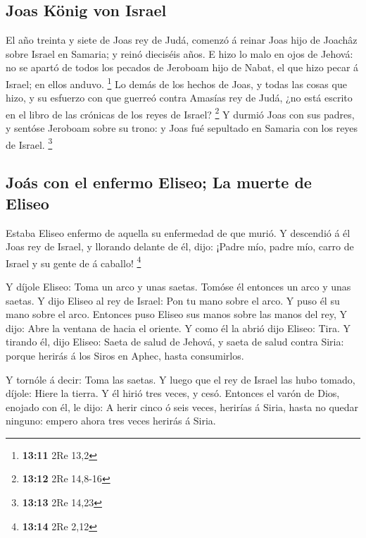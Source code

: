 \hypertarget{joas-kuxf6nig-von-israel}{%
\subsection{Joas König von Israel}\label{joas-kuxf6nig-von-israel}}

 El año treinta y siete de Joas rey de Judá, comenzó á
reinar Joas hijo de Joachâz sobre Israel en Samaria; y reinó dieciséis
años.  E hizo lo malo en ojos de Jehová: no se apartó de
todos los pecados de Jeroboam hijo de Nabat, el que hizo pecar á Israel;
en ellos anduvo. \footnote{\textbf{13:11} 2Re 13,2}  Lo
demás de los hechos de Joas, y todas las cosas que hizo, y su esfuerzo
con que guerreó contra Amasías rey de Judá, ¿no está escrito en el libro
de las crónicas de los reyes de Israel? \footnote{\textbf{13:12} 2Re
  14,8-16}  Y durmió Joas con sus padres, y sentóse
Jeroboam sobre su trono: y Joas fué sepultado en Samaria con los reyes
de Israel. \footnote{\textbf{13:13} 2Re 14,23}

\hypertarget{jouxe1s-con-el-enfermo-eliseo-la-muerte-de-eliseo}{%
\subsection{Joás con el enfermo Eliseo; La muerte de
Eliseo}\label{jouxe1s-con-el-enfermo-eliseo-la-muerte-de-eliseo}}

 Estaba Eliseo enfermo de aquella su enfermedad de que
murió. Y descendió á él Joas rey de Israel, y llorando delante de él,
dijo: ¡Padre mío, padre mío, carro de Israel y su gente de á caballo!
\footnote{\textbf{13:14} 2Re 2,12}

 Y díjole Eliseo: Toma un arco y unas saetas. Tomóse él
entonces un arco y unas saetas.  Y dijo Eliseo al rey de
Israel: Pon tu mano sobre el arco. Y puso él su mano sobre el arco.
Entonces puso Eliseo sus manos sobre las manos del rey,  Y
dijo: Abre la ventana de hacia el oriente. Y como él la abrió dijo
Eliseo: Tira. Y tirando él, dijo Eliseo: Saeta de salud de Jehová, y
saeta de salud contra Siria: porque herirás á los Siros en Aphec, hasta
consumirlos.

 Y tornóle á decir: Toma las saetas. Y luego que el rey de
Israel las hubo tomado, díjole: Hiere la tierra. Y él hirió tres veces,
y cesó.  Entonces el varón de Dios, enojado con él, le
dijo: A herir cinco ó seis veces, herirías á Siria, hasta no quedar
ninguno: empero ahora tres veces herirás á Siria.

